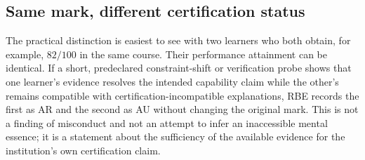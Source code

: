 \subsection{Same mark, different certification status}
The practical distinction is easiest to see with two learners who both obtain, for example, $82/100$ in the same course. Their performance attainment can be identical. If a short, predeclared constraint-shift or verification probe shows that one learner's evidence resolves the intended capability claim while the other's remains compatible with certification-incompatible explanations, RBE records the first as AR and the second as AU without changing the original mark. This is not a finding of misconduct and not an attempt to infer an inaccessible mental essence; it is a statement about the sufficiency of the available evidence for the institution's own certification claim.
